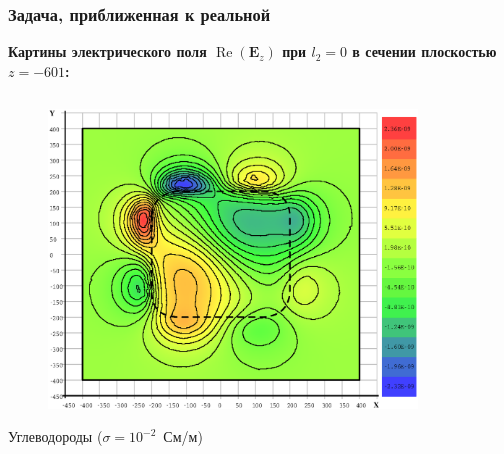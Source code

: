 \documentclass[aspectratio=43]{beamer}
\renewcommand{\Re}{\mathop{\mathrm{Re}}\nolimits}
\newcommand{\MakeTitle}[1]{\frametitle{\hspace{1.5em}\textbf{#1} \hfill \insertframenumber{} }}
\begin{document}

\begin{frame}
	\MakeTitle{Задача, приближенная к реальной}
	\textbf{Картины электрического поля $\Re(\mathbf{E}_z)$ при $l_2 = 0$ в сечении плоскостью $z=-601$:}
	\begin{columns}[t,totalwidth=\linewidth]
		\hspace{-0.07\linewidth}
		\begin{column}{.5\linewidth}
			\vspace{-2.75em}
			\begin{figure}[H]
				\includegraphics[width=1.1\textwidth,height=1.1\textheight,keepaspectratio]{0_no_z=-601_EzR.eps}
			\end{figure}
			\begin{center}
				\vspace{-1em}
				\tiny{Углеводороды ($\sigma = 10^{-2}$~См/м)}
			\end{center}
		\end{column}
		\begin{column}{.5\linewidth}
			\vspace{-2.75em}
			\begin{figure}[H]

\end{figure}
\end{column}
\end{columns}
\end{frame}
\end{document}
